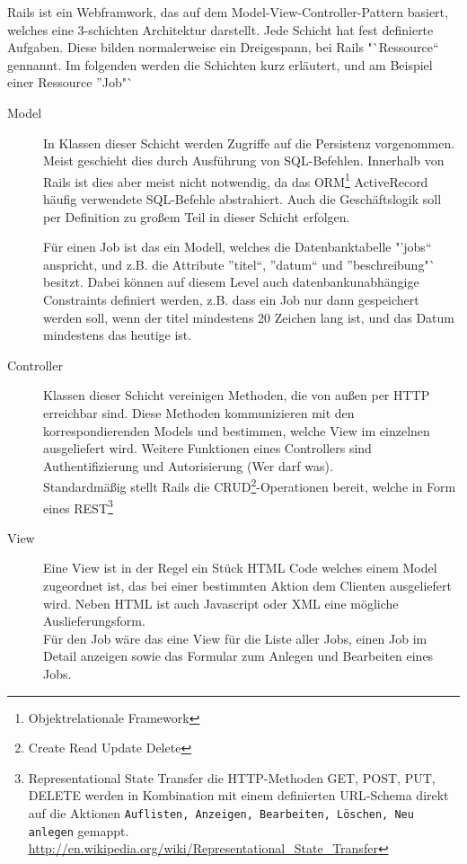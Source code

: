Rails ist ein Webframwork, das auf dem Model-View-Controller-Pattern basiert, welches eine 3-schichten Architektur darstellt. Jede Schicht hat fest definierte Aufgaben. Diese bilden normalerweise ein Dreigespann, bei Rails "`Ressource"` gennannt. Im folgenden werden die Schichten kurz erläutert, und am Beispiel einer Ressource "'Job"` 
\begin{description}
 \item[Model] In Klassen dieser Schicht werden Zugriffe auf die Persistenz vorgenommen. Meist geschieht dies durch Ausführung von SQL-Befehlen. Innerhalb von Rails ist dies aber meist nicht notwendig, da das ORM\footnote{Objektrelationale Framework} ActiveRecord häufig verwendete SQL-Befehle abstrahiert. Auch die Geschäftslogik soll per Definition zu großem Teil in dieser Schicht erfolgen.
 
 Für einen Job ist das ein Modell, welches die Datenbanktabelle "'jobs"` anspricht, und z.B. die Attribute "'titel"`, "'datum"` und "'beschreibung"` besitzt. Dabei können auf diesem Level auch datenbankunabhängige Constraints definiert werden, z.B. dass ein Job nur dann gespeichert werden soll, wenn der titel mindestens 20 Zeichen lang ist, und das Datum mindestens das heutige ist.
 \item[Controller] Klassen dieser Schicht vereinigen Methoden, die von außen per HTTP erreichbar sind. Diese Methoden kommunizieren mit den korrespondierenden Models und bestimmen, welche View im einzelnen ausgeliefert wird. Weitere Funktionen eines Controllers sind Authentifizierung und Autorisierung (Wer darf was).\\
 Standardmäßig stellt Rails die CRUD\footnote{Create Read Update Delete}-Operationen bereit, welche in Form eines REST\footnote{Representational State Transfer die HTTP-Methoden GET, POST, PUT, DELETE werden in Kombination mit einem definierten URL-Schema direkt auf die Aktionen \texttt{Auflisten, Anzeigen, Bearbeiten, Löschen, Neu anlegen} gemappt.
 \url{http://en.wikipedia.org/wiki/Representational_State_Transfer}}
 \item[View] Eine View ist in der Regel ein Stück HTML Code welches einem Model zugeordnet ist, das bei einer bestimmten Aktion dem Clienten ausgeliefert wird. Neben HTML ist auch Javascript oder XML eine mögliche Auslieferungsform.\\
 Für den Job wäre das eine View für die Liste aller Jobs, einen Job im Detail anzeigen sowie das Formular zum Anlegen und Bearbeiten eines Jobs.
 \end{description}
